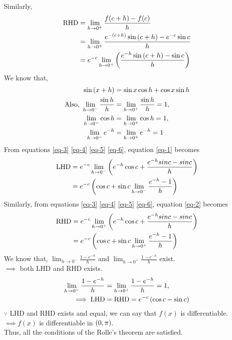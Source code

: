\documentclass[journal,12pt,twocolumn]{IEEEtran}
\begin{document}
Similarly,
\begin{align}
    \text{RHD} &= \lim_{h \to 0^{+}} \frac{f(c+h)-f(c)}{h}\\
    &= \lim_{h \to 0^{+}} \frac{e^{-\left(c+h\right)} \sin \left(c+h\right) - e^{-c} \sin c}{h}\\
    \label{eq-2}
    &= e^{-c} \lim_{h \to 0^{+}} \left(\frac{e^{-h} \sin \left(c+h\right) - \sin c}{h}\right)
\end{align}
We know that,
\begin{align}
    \label{eq-3}
    \sin \left(x+h\right) &= \sin x \cos h + \cos x \sin h\\
    \label{eq-4}
    \text{Also, } \lim_{h \to 0^{-}} \frac{\sin h}{h} &= \lim_{h \to 0^{+}} \frac{\sin h}{h} = 1,\\
    \label{eq-5}
    \lim_{h \to 0^{-}} \cos h &= \lim_{h \to 0^{+}} \cos h = 1,\\
    \label{eq-6}
    \lim_{h \to 0^{-}} e^{-h} &= \lim_{h \to 0^{+}} e^{-h} = 1
\end{align}
From equations \eqref{eq-3} \eqref{eq-4} \eqref{eq-5} \eqref{eq-6}, equation \eqref{eq-1} becomes
\begin{align}
    \text{LHD} &= e^{-c} \lim_{h \to 0^{-}} \left(e^{-h} \cos c +\frac{e^{-h}sinc - sinc}{h}\right)\\
    &= e^{-c} \left(\cos c + \sin c \lim_{h \to 0^{-}} \frac{e^{-h}-1}{h}\right)
\end{align}
Similarly, from equations \eqref{eq-3} \eqref{eq-4} \eqref{eq-5} \eqref{eq-6}, equation \eqref{eq-2} becomes
\begin{align}
    \text{RHD} &= e^{-c} \lim_{h \to 0^{+}} \left(e^{-h} \cos c +\frac{e^{-h}sinc - sinc}{h}\right)\\
    &= e^{-c} \left(\cos c + \sin c \lim_{h \to 0^{+}} \frac{e^{-h}-1}{h}\right)
\end{align}
We know that, $\lim_{h \to 0^{-}} \frac{1-e^{-h}}{h}$ and $\lim_{h \to 0^{+}} \frac{1-e^{-h}}{h}$ exist.\\
$\implies$ both LHD and RHD exists.
\begin{align}
    \lim_{h \to 0^{-}} \frac{1-e^{-h}}{h} &= \lim_{h \to 0^{+}} \frac{1-e^{-h}}{h} = 1,\\
    \implies \text{LHD} &= \text{RHD} = e^{-c} \left(\cos c - \sin c\right)
\end{align}
$\because$ LHD and RHD exists and equal, we can say that $f(x)$ is differentiable.\\
$\implies f(x)$ is differentiable in $\left(0,\pi\right)$.\\
Thus, all the conditions of the Rolle's theorem are satisfied.\\
\end{document}
